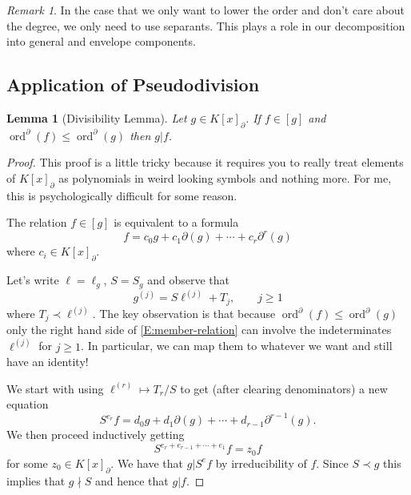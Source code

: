 \documentclass[12pt]{book}
\numberwithin{equation}{section}
\newtheorem{lemma}[theorem]{Lemma}
\theoremstyle{definition}
\theoremstyle{remark}
\newtheorem{remark}[theorem]{Remark}
\newcommand{\ord}{\operatorname{ord}}
\begin{document}
\begin{remark}
	In the case that we only want to lower the order and don't care about the degree, we only need to use separants. 
	This plays a role in our decomposition into general and envelope components.
\end{remark}

\subsection{Application of Pseudodivision}\label{S:application-of-division}


\begin{lemma}[Divisibility Lemma]
	Let $g \in K [x]_{\partial}$.
	If $f \in [g]$ and $\ord^{\partial}(f) \leq \ord^{\partial}(g)$ then $g \vert f$. 
\end{lemma}
\begin{proof}
	This proof is a little tricky because it requires you to really treat elements of $K[x]_{\partial}$ as polynomials in weird looking symbols and nothing more. 
	For me, this is psychologically difficult for some reason.
	
	The relation $f \in [g]$ is equivalent to a formula 
	\begin{equation}\label{E:member-relation}
	 f = c_0 g + c_1 \partial(g) + \cdots + c_r \partial^r(g)
	\end{equation}
	where $c_i \in K[x]_{\partial}$.
	
	Let's write $\ell = \ell_g$, $S=S_g$ and observe that 
	 $$ g^{(j)} = S\ell^{(j)} + T_j, \qquad j\geq 1 $$
	where $T_j\prec \ell^{(j)}$.
	The key observation is that because $\ord^{\partial}(f)\leq \ord^{\partial}(g)$ only the right hand side of \eqref{E:member-relation} can involve the indeterminates $\ell^{(j)}$ for $j\geq 1$.
	In particular, we can map them to whatever we want and still have an identity!
	
	We start with using $\ell^{(r)} \mapsto T_r/S$ to get (after clearing denominators) a new equation
	 $$ S^{e_r} f = d_0 g+ d_1 \partial(g) + \cdots + d_{r-1} \partial^{r-1}(g).$$
	We then proceed inductively getting 
	 $$ S^{e_r+e_{r-1}+\cdots + e_1} f = z_0 f $$
	for some $z_0 \in K[x]_{\partial}$.
	We have that $g \vert S^e f$ by irreducibility of $f$. 
	Since $S\prec g$ this implies that $g\nmid S$ and hence that $g \vert f$. 
\end{proof}
\end{document}
